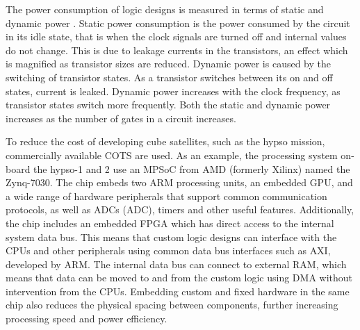 The power consumption of logic designs is measured in terms of static and dynamic power \cite{sarpeshkarUniversalPrinciplesUltra2012}. Static power consumption is the power consumed by the circuit in its idle state, that is when the clock signals are turned off and internal values do not change. This is due to leakage currents in the transistors, an effect which is magnified as transistor sizes are reduced. Dynamic power is caused by the switching of transistor states. As a transistor switches between its on and off states, current is leaked. Dynamic power increases with the clock frequency, as transistor states switch more frequently. Both the static and dynamic power increases as the number of gates in a circuit increases.

To reduce the cost of developing cube satellites, such as the \acrshort{hypso} mission, commercially available \acrfull{COTS} are used. As an example, the processing system on-board the \acrshort{hypso}-1 and 2 use an \acrshort{MPSoC} from AMD (formerly Xilinx) named the Zynq-7030. The chip embeds two ARM processing units, an embedded \acrshort{GPU}, and a wide range of hardware peripherals that support common communication protocols, as well as \acrlong{ADC}s (\acrshort{ADC}), timers and other useful features. Additionally, the chip includes an embedded \acrshort{FPGA} which has direct access to the internal system data bus. This means that custom logic designs can interface with the \acrshort{CPU}s and other peripherals using common data bus interfaces such as \acrshort{AXI}, developed by ARM. The internal data bus can connect to external \acrshort{RAM}, which means that data can be moved to and from the custom logic using \acrfull{DMA} without intervention from the \acrshort{CPU}s. Embedding custom and fixed hardware in the same chip also reduces the physical spacing between components, further increasing processing speed and power efficiency.
